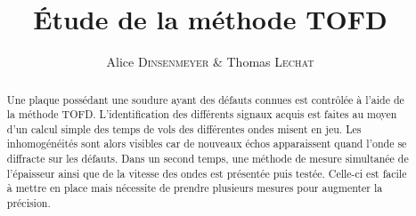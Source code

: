 \documentclass[twoside]{article}
\title{\vspace{-15mm}\fontsize{24pt}{10pt}\selectfont\textbf{Étude de la méthode TOFD}} %
\author{
\large
{Alice \textsc{Dinsenmeyer} \& Thomas \textsc{Lechat}}\\[2mm] %
\vspace{-5mm}
}
\date{}
\begin{document}
\maketitle %

\thispagestyle{fancy} %


\begin{abstract}

\noindent

Une plaque possédant une soudure ayant des défauts connues est contrôlée à l'aide de la méthode TOFD. L'identification des différents signaux acquis est faites au moyen d'un calcul simple des temps de vols des différentes ondes misent en jeu. Les inhomogénéités sont alors visibles car de nouveaux échos apparaissent quand l'onde se diffracte sur les défauts. Dans un second temps, une méthode de mesure simultanée de l'épaisseur ainsi que de la vitesse des ondes est présentée puis testée. Celle-ci est facile à mettre en place mais nécessite de prendre plusieurs mesures pour augmenter la précision.

\end{abstract}

\end{document}
